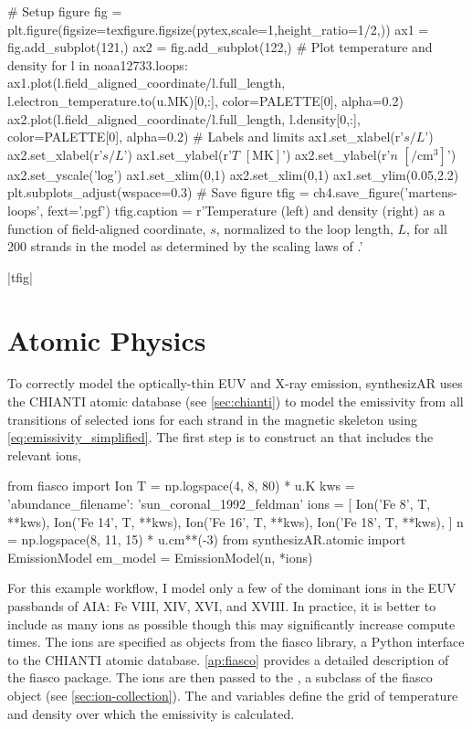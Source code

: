 \begin{pycode}[chapter4]
# Setup figure
fig = plt.figure(figsize=texfigure.figsize(pytex,scale=1,height_ratio=1/2,))
ax1 = fig.add_subplot(121,)
ax2 = fig.add_subplot(122,)
# Plot temperature and density
for l in noaa12733.loops:
    ax1.plot(l.field_aligned_coordinate/l.full_length,
             l.electron_temperature.to(u.MK)[0,:],
             color=PALETTE[0], alpha=0.2)
    ax2.plot(l.field_aligned_coordinate/l.full_length,
             l.density[0,:],
             color=PALETTE[0], alpha=0.2)
# Labels and limits
ax1.set_xlabel(r'$s/L$')
ax2.set_xlabel(r'$s/L$')
ax1.set_ylabel(r'$T$ $[\si{\mega\kelvin}]$')
ax2.set_ylabel(r'$n$ $[\si{\per\cubic\cm}]$')
ax2.set_yscale('log')
ax1.set_xlim(0,1)
ax2.set_xlim(0,1)
ax1.set_ylim(0.05,2.2)
plt.subplots_adjust(wspace=0.3)
# Save figure
tfig = ch4.save_figure('martens-loops', fext='.pgf')
tfig.caption = r'Temperature (left) and density (right) as a function of field-aligned coordinate, $s$, normalized to the loop length, $L$, for all 200 strands in the model \AR{} as determined by the scaling laws of \citet{martens_scaling_2010}.'
\end{pycode}
\py[chapter4]|tfig|

\section{Atomic Physics}\label{sec:atomic-physics}


To correctly model the optically-thin EUV and X-ray emission, synthesizAR uses the CHIANTI atomic database (see \autoref{sec:chianti}) to model the emissivity from all transitions of selected ions for each strand in the magnetic skeleton using \autoref{eq:emissivity_simplified}. The first step is to construct an  that includes the relevant ions,
\begin{pyblock}[chapter4][baselinestretch=1,xleftmargin=3em]
from fiasco import Ion
T = np.logspace(4, 8, 80) * u.K
kws = { 'abundance_filename': 'sun_coronal_1992_feldman' }
ions = [
    Ion('Fe 8', T, **kws),
    Ion('Fe 14', T, **kws),
    Ion('Fe 16', T, **kws),
    Ion('Fe 18', T, **kws),
]
n = np.logspace(8, 11, 15) * u.cm**(-3)
from synthesizAR.atomic import EmissionModel
em_model = EmissionModel(n, *ions)
\end{pyblock}
For this example workflow, I model only a few of the dominant ions in the EUV passbands of AIA: Fe VIII, XIV, XVI, and XVIII. In practice, it is better to include as many ions as possible though this may significantly increase compute times. The ions are specified as  objects from the fiasco library, a Python interface to the CHIANTI atomic database. \autoref{ap:fiasco} provides a detailed description of the fiasco package. The ions are then passed to the , a subclass of the fiasco  object (see \autoref{sec:ion-collection}). The  and  variables define the grid of temperature and density over which the emissivity is calculated.

